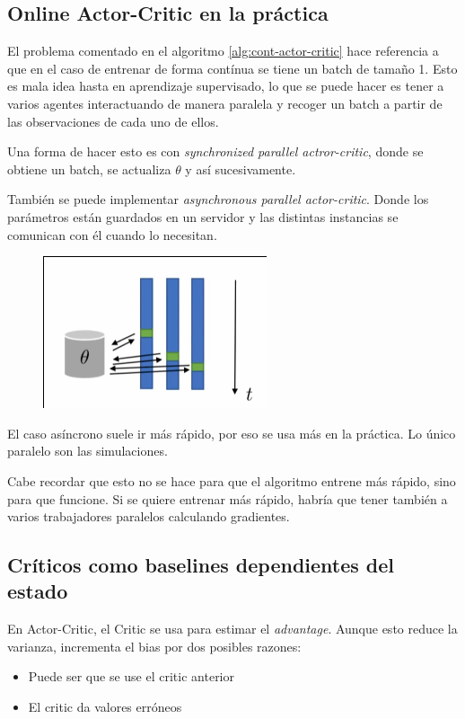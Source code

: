\subsection{Online Actor-Critic en la práctica}%
\label{sub:online_actor_critic_en_la_práctica}

El problema comentado en el algoritmo \ref{alg:cont-actor-critic} hace referencia a que en
el caso de entrenar de forma contínua se tiene un batch de tamaño 1. Esto es mala idea hasta en
aprendizaje supervisado, lo que se puede hacer es tener a varios agentes interactuando de
manera paralela y recoger un batch a partir de las observaciones de cada uno de ellos. 

Una forma de hacer esto es con \textit{synchronized parallel actror-critic}, donde se obtiene un
batch, se actualiza $\theta$ y así sucesivamente.

También se puede implementar \textit{asynchronous parallel actor-critic}. Donde los parámetros
están guardados en un servidor y las distintas instancias se comunican con él cuando lo
necesitan.

\begin{figure}[htpb]
	\centering
	\includegraphics[width=0.3\linewidth]{figures/2020-06-14-123924_249x169_scrot.png}
\end{figure}

El caso asíncrono suele ir más rápido, por eso se usa más en la práctica. Lo único paralelo son
las simulaciones.

Cabe recordar que esto no se hace para que el algoritmo entrene más rápido, sino para que
funcione. Si se quiere entrenar más rápido, habría que tener también a varios trabajadores
paralelos calculando gradientes.

\subsection{Críticos como baselines dependientes del estado}%
\label{sub:críticos_como_baselines_dependientes_del_estado}

En Actor-Critic, el Critic se usa para estimar el \textit{advantage}. Aunque esto reduce la
varianza, incrementa el bias por dos posibles razones:
\begin{itemize}
    \item Puede ser que se use el critic anterior
    \item El critic da valores erróneos
\end{itemize}

